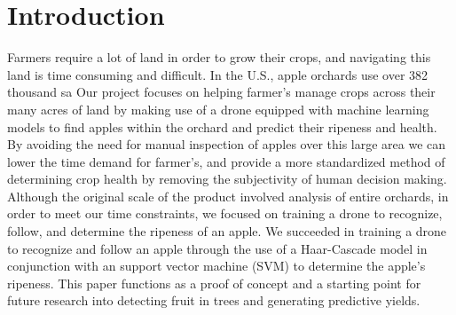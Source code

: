 \section{Introduction}
Farmers require a lot of land in order to grow their crops, and navigating this land is time consuming and difficult.
In the U.S., apple orchards use over 382 thousand sa 
Our project focuses on helping farmer's manage crops across their many acres of land by making use of a drone equipped with machine learning models to 
find apples within the orchard and predict their ripeness and health. By avoiding the need for manual inspection of apples over this large area 
we can lower the time demand for farmer's, and provide a more standardized method of determining crop health by removing the subjectivity of human decision making.
Although the original scale of the product involved analysis of entire orchards, in order to meet our time constraints, we focused on training a drone to recognize, follow, and determine the ripeness of an apple. We succeeded in training a drone to recognize and follow an apple through the use of a Haar-Cascade model in conjunction with an support vector machine (SVM) to determine the apple's ripeness. This paper functions as a proof of concept and a starting point for future research into detecting fruit in trees and generating predictive yields.
\\
